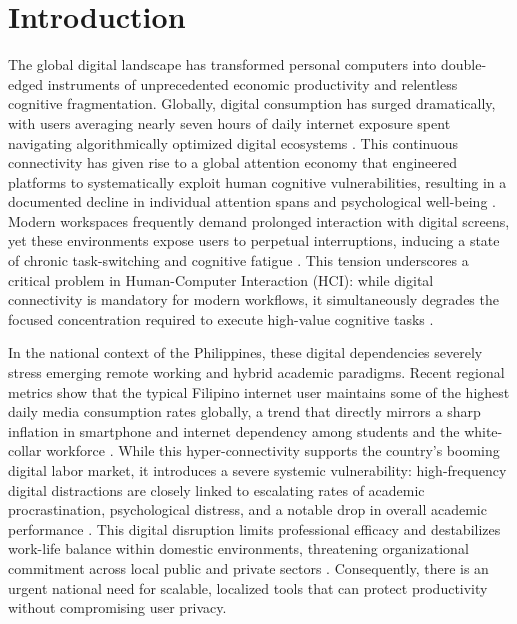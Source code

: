 \documentclass[conference]{IEEEtran}
\begin{document}
\section{Introduction} 
The global digital landscape has transformed personal computers into double-edged instruments of unprecedented economic productivity and relentless cognitive fragmentation. Globally, digital consumption has surged dramatically, with users averaging nearly seven hours of daily internet exposure spent navigating algorithmically optimized digital ecosystems \cite{Kemp2025, Meltwater2025}. This continuous connectivity has given rise to a global attention economy that engineered platforms to systematically exploit human cognitive vulnerabilities, resulting in a documented decline in individual attention spans and psychological well-being \cite{CenterForHumaneTechnology2024, Mark2023}. Modern workspaces frequently demand prolonged interaction with digital screens, yet these environments expose users to perpetual interruptions, inducing a state of chronic task-switching and cognitive fatigue \cite{Tandon2021}. This tension underscores a critical problem in Human-Computer Interaction (HCI): while digital connectivity is mandatory for modern workflows, it simultaneously degrades the focused concentration required to execute high-value cognitive tasks \cite{Newport2019}.

In the national context of the Philippines, these digital dependencies severely stress emerging remote working and hybrid academic paradigms. Recent regional metrics show that the typical Filipino internet user maintains some of the highest daily media consumption rates globally, a trend that directly mirrors a sharp inflation in smartphone and internet dependency among students and the white-collar workforce \cite{Meltwater2025}. While this hyper-connectivity supports the country's booming digital labor market, it introduces a severe systemic vulnerability: high-frequency digital distractions are closely linked to escalating rates of academic procrastination, psychological distress, and a notable drop in overall academic performance \cite{Tiking2024, Geronimo2025, Vimala2025}. This digital disruption limits professional efficacy and destabilizes work-life balance within domestic environments, threatening organizational commitment across local public and private sectors \cite{Tecson2026}. Consequently, there is an urgent national need for scalable, localized tools that can protect productivity without compromising user privacy.
\end{document}
